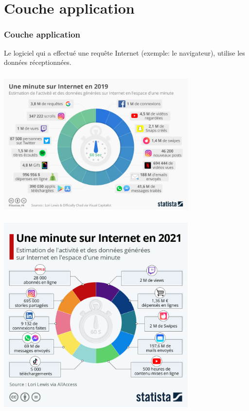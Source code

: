 \documentclass[svgnames,11pt]{beamer}
\begin{document}
\section{Couche application}
\begin{frame}
    \frametitle{Couche application}

    \begin{aretenir}[]
    Le logiciel qui a effectué une requête Internet (exemple: le navigateur), utilise les données réceptionnées.
    \end{aretenir}

\end{frame}
\begin{frame}
    \frametitle{}

    \begin{center}
    \centering
    \includegraphics[width=10cm]{ressources/une-minute.jpeg}
    \end{center}

\end{frame}
\begin{frame}
    \frametitle{}

    \begin{center}
    \centering
    \includegraphics[width=10cm]{ressources/uneminute2021.jpeg}
    \end{center}

\end{frame}
\end{document}
